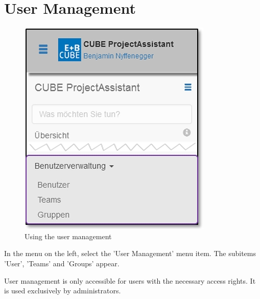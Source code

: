 
\clearpage
\section{User Management}

\begin{figure}   %
  \vspace{-35pt}      %
  \begin{center}
    \includegraphics[width=1\linewidth]{../chapters/14_Benutzerverwaltung/pictures/14_Menu_Benutzerverwaltung.jpg}
  \end{center}
  \vspace{-20pt}
  \caption{Using the user management}
  \vspace{-10pt}
\end{figure}

In the menu on the left, select the 'User Management' menu item. The subitems 'User', 'Teams' and 'Groups' appear.

\vspace{\baselineskip}

User management is only accessible for users with the necessary access rights. It is used exclusively by administrators.

